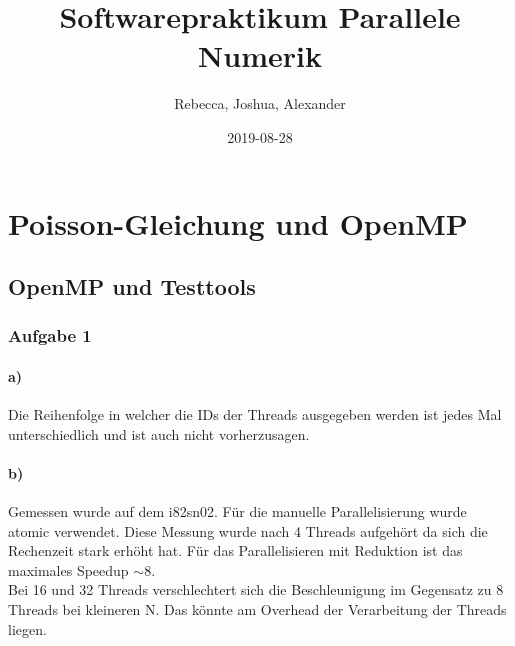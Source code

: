 \documentclass{report}
\title{Softwarepraktikum Parallele Numerik}
\date{2019-08-28}
\author{Rebecca, Joshua, Alexander}
\begin{document}
    \maketitle
        \newpage
    \tableofcontents
    \newpage
    \chapter{Poisson-Gleichung und OpenMP}
    \section{OpenMP und Testtools}
    \subsection{Aufgabe 1}
        \subsubsection{a)}
        Die Reihenfolge in welcher die IDs der Threads ausgegeben werden ist jedes Mal unterschiedlich und ist auch nicht vorherzusagen.
        
        \subsubsection{b)}
        Gemessen wurde auf dem i82sn02. Für die manuelle Parallelisierung wurde atomic verwendet. Diese Messung wurde nach 4 Threads aufgehört da sich die Rechenzeit stark erhöht hat. Für das Parallelisieren mit Reduktion ist das maximales Speedup $ \sim 8 $.\\
        Bei 16 und 32 Threads verschlechtert sich die Beschleunigung im Gegensatz zu 8 Threads bei kleineren N. Das könnte am Overhead der Verarbeitung der Threads liegen.
        
\end{document}
